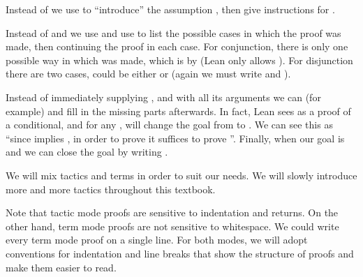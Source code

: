 \documentclass[letterpaper,10pt,english]{sphinxmanual}
\begin{document}
\sphinxAtStartPar
Instead of  we use 
to “introduce” the assumption ,
then give instructions for .

\sphinxAtStartPar
Instead of  and  we use 
and use \sphinxcode{\sphinxupquote{|}} to list the possible cases in which the proof  was made,
then continuing the proof in each case.
For conjunction, there is only one possible way in which  was made,
which is by  (Lean only allows ).
For disjunction there are two cases,
 could be either  or 
(again we must write  and ).

\sphinxAtStartPar
Instead of immediately supplying ,  and 
with all its arguments we can (for example)  and
fill in the missing parts afterwards.
In fact, Lean sees  as a proof of a conditional,
and for any ,
 will change the goal from  to .
We can see this as “since  implies , in order to prove 
it suffices to prove ”.
Finally, when our goal is  and  we can close the goal
by writing .

\sphinxAtStartPar
We will mix tactics and terms in order to suit our needs.
We will slowly introduce more and more tactics throughout this textbook.

\sphinxAtStartPar
Note that tactic mode proofs are sensitive to indentation and returns.
On the other hand, term mode proofs are not sensitive to whitespace.
We could write every term mode proof on a single line.
For both modes,
we will adopt conventions for indentation and line breaks that
show the structure of proofs and make them easier to read.
\end{document}

